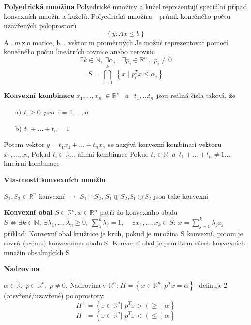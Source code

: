 \documentclass[a4]{report}
\theoremstyle{definition}
\begin{document}
\textbf{Polyedrická množina}
Polyedrické množiny a kužel reprezentují speciální případ konvexních množin a kuželů.
Polyedrická množina - průnik konečného počtu uzavřených poloprostorů 
$$\left \{ y: Ax\leq b \right \}$$
A...$m\, \texttt{x}\, n$ matice, b... vektor m proměnných
\newline Je možné reprezentovat pomocí konečného počtu lineárních rovnice anebo nerovnic
$$\exists k\in \mathbb{N},\; \exists \alpha _{i }\; ,\; \exists p_{i}\in \mathbb{R}^{n}\; ,\; p_{i}\neq 0$$
$$S=\bigcap_{i=1}^{k}\; \left \{ x\; |\; p_{i}^{T}x\leq \alpha _{i} \right \}$$

\textbf{Konvexní kombinace}
$x_{1},...,x_{n}\; \in \mathbb{R}^{n}\; \; \; a\; \; \; t_{1},...t_{n}$ jsou reálná čísla taková, že
\begin{enumerate}
\item[a)] $t_{i}\geq 0\; \; pro\; \; i=1,...,n$
\item[b)] $t_{1}+...+t_{n}=1$
\end{enumerate}
Potom vektor $ y=t_{1}x_{1}+...+t_{n}x_{n}$ se nazývá konvexní kombinací vektoru $x_{1},...,x_{n}$
Pokud $t_{i}\in \mathbb{R}$... afinní kombinace 
\newline Pokud $t_{i}\in \mathbb{R}\; \; a\; \; t_{1}+...+t_{n}\neq 1$... lineární kombinace

\textbf{Vlastnosti konvexních množin}

$S_{1},S_{2}\in \mathbb{R}^{n} $ konvexní $\rightarrow $ $S_{1}\cap S_{2}$, $S_{1}\oplus S_{2}$,$S_{1}\ominus S_{2}$ jsou také konvexní 

\textbf{Konvexní obal}
$S\in \mathbb{R}^{n},x\in \mathbb{R}^{n}$ patří do konvexního obalu $S\Leftrightarrow \exists k\in \mathbb{N},\; \exists \lambda _{1},...,\lambda _{n}\geq 0,\; \sum_{1}^{k}\lambda _{j}=1,\; \; \; \; \exists x_{1},...,x_{k}\in S:\; x=\sum_{j=1}^{k}\lambda _{j}x_{j}$ 
\newline příklad: Konvexní obal kružnice je kruh, pokud je množina S konvexní, potom je rovná (svému) konvexnímu obalu S.
\newline Konvexní obal je průnikem všech konvexních množin obsahujících S

\textbf{Nadrovina}

$\alpha \in \mathbb{R},\; p\in \mathbb{R}^{n},\; p\neq 0$. Nadrovina v $\mathbb{R}^{n} $: $H=\left \{ x\in \mathbb{R}^{n}|\; p^{T}x=\alpha  \right \} $
\newline -definuje 2 (otevřené/uzavřené) poloprostory:
$$H^{+}=\left \{ x\in \mathbb{R}^{n}|\; p^{T}x> (\geq )\alpha  \right \}$$
$$H^{-}=\left \{ x\in \mathbb{R}^{n}|\; p^{T}x< (\leq )\alpha  \right \}$$
\end{document}
